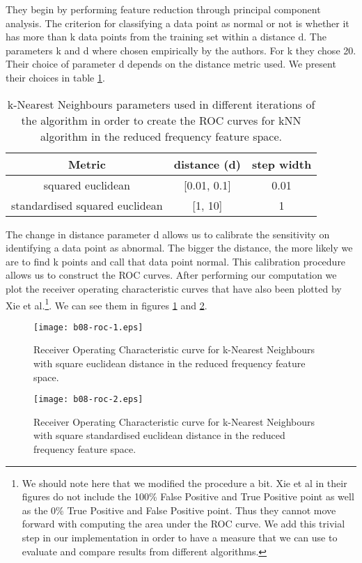 \documentclass[reqno,openany,12pt]{amsbook}
\begin{document}
They begin by performing feature reduction through principal component analysis. The criterion for classifying a data point as normal or not is whether it has more than k data points from the training set within a distance d. The parameters k and d where chosen empirically by the authors. For k they chose 20. Their choice of parameter d depends on the distance metric used. We present their choices\cite{adf1} in table \ref{knnt2}.
\begin{table}
\begin{tabular}{|c|c|c|}
\hline
Metric &  distance (d) & step width  \\ \hline 
squared euclidean & [0.01, 0.1] & 0.01 \\ \hline
standardised squared euclidean & [1, 10] & 1 \\ \hline
\end{tabular}
\vspace{5pt}
\caption[k-Nearest Neighbours parameters.]{k-Nearest Neighbours parameters used in different iterations of the algorithm in order to create the ROC curves for kNN algorithm in the reduced frequency feature space.}
\label{knnt2}
\end{table}
The change in distance parameter d allows us to calibrate the sensitivity on identifying a data point as abnormal. The bigger the distance, the more likely we are to find k points and call that data point normal. This calibration procedure allows us to construct the ROC curves.
After performing our computation we plot the receiver operating characteristic curves that have also been plotted by  Xie et al.\cite{adf1}\footnote{
We should note here that we modified the procedure a bit.  Xie et al\cite{adf1} in their figures do not include the 100\% False Positive and True Positive point as well as the 0\% True Positive and False Positive point. Thus they cannot move forward with computing the area under the ROC curve. We add this trivial step in our implementation in order to have a measure that we can use to evaluate and compare results from different algorithms.
}. We can see them in figures \ref{knnroc1} and \ref{knnroc2}.

\begin{figure}
\texttt{[image: b08-roc-1.eps]}
\caption[kNN ROC curves on squared euclidean distance]{Receiver Operating Characteristic curve for k-Nearest Neighbours with square euclidean distance in the reduced frequency feature space.}
\label{knnroc1}
\end{figure}
\begin{figure}
\texttt{[image: b08-roc-2.eps]}
\caption[kNN ROC curves on squared standardised euclidean distance]{Receiver Operating Characteristic curve for k-Nearest Neighbours with square standardised euclidean distance in the reduced frequency feature space.}
\label{knnroc2}
\end{figure}
\end{document}
